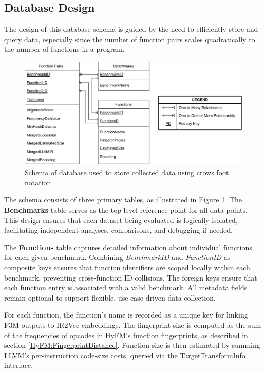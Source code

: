 \subsection{Database Design} \label{subsection:DatabaseSchema}
The design of this database schema is guided by the need to efficiently store and query data, especially since the number of function pairs scales quadratically to the number of functions in a program.

\begin{figure}[tbh!]
\centering
\includegraphics[scale=0.85]{Figures/DataCollectionSchema.pdf}
\caption{Schema of database used to store collected data using crows foot notation}\label{fig:DatabaseSchema}
\end{figure}


The schema consists of three primary tables, as illustrated in Figure \ref{fig:DatabaseSchema}. The \textbf{Benchmarks} table serves as the top-level reference point for all data points. This design ensures that each dataset being evaluated is logically isolated, facilitating independent analyses, comparisons, and debugging if needed.

The \textbf{Functions} table captures detailed information about individual functions for each given benchmark. Combining \textit{BenchmarkID} and \textit{FunctionID} as composite keys ensures that function identifiers are scoped locally within each benchmark, preventing cross-function ID collisions. The foreign keys ensure that each function entry is associated with a valid benchmark. All metadata fields remain optional to support flexible, use‑case‑driven data collection.

For each function, the function's name is recorded as a unique key for linking F3M outputs to IR2Vec embeddings. The fingerprint size is computed as the sum of the frequencies of opcodes in HyFM's function fingerprints, as described in section \ref{HyFM:FingerprintDistance}. Function size is then estimated by summing LLVM’s per‑instruction code‑size costs, queried via the TargetTransformInfo interface.

